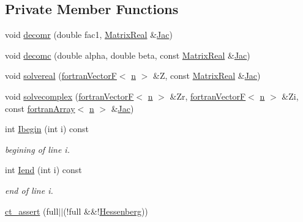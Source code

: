 \subsection*{Private Member Functions}
\begin{DoxyCompactItemize}
\item 
void \hyperlink{classodes_1_1Matrices_a8dc1bc6d92d06af08d4bf8fb2b357a7d}{decomr} (double fac1, \hyperlink{classodes_1_1Radau5cc_a8ef067b8852403d48d8528f601a4626a}{Matrix\+Real} \&\hyperlink{classodes_1_1Radau5cc_a67b952c35d2c7ecddc9dd75cb2c3afe1}{Jac})
\item 
void \hyperlink{classodes_1_1Matrices_a9f497885fb6dd9bb22179fab49d9b587}{decomc} (double alpha, double beta, const \hyperlink{classodes_1_1Radau5cc_a8ef067b8852403d48d8528f601a4626a}{Matrix\+Real} \&\hyperlink{classodes_1_1Radau5cc_a67b952c35d2c7ecddc9dd75cb2c3afe1}{Jac})
\item 
void \hyperlink{classodes_1_1Matrices_ace113b7bfa2377d513c2faaf645aecaa}{solvereal} (\hyperlink{classodes_1_1fortranVectorF}{fortran\+Vector\+F}$<$ \hyperlink{classodes_1_1Radau5cc_a3be3f05d2cdf7268e7d09b62ad9ad494}{n} $>$ \&Z, const \hyperlink{classodes_1_1Radau5cc_a8ef067b8852403d48d8528f601a4626a}{Matrix\+Real} \&\hyperlink{classodes_1_1Radau5cc_a67b952c35d2c7ecddc9dd75cb2c3afe1}{Jac})
\item 
void \hyperlink{classodes_1_1Matrices_abce8558c305de75740568ec55e49338e}{solvecomplex} (\hyperlink{classodes_1_1fortranVectorF}{fortran\+Vector\+F}$<$ \hyperlink{classodes_1_1Radau5cc_a3be3f05d2cdf7268e7d09b62ad9ad494}{n} $>$ \&Zr, \hyperlink{classodes_1_1fortranVectorF}{fortran\+Vector\+F}$<$ \hyperlink{classodes_1_1Radau5cc_a3be3f05d2cdf7268e7d09b62ad9ad494}{n} $>$ \&Zi, const \hyperlink{classodes_1_1fortranArray}{fortran\+Array}$<$ \hyperlink{classodes_1_1Radau5cc_a3be3f05d2cdf7268e7d09b62ad9ad494}{n} $>$ \&\hyperlink{classodes_1_1Radau5cc_a67b952c35d2c7ecddc9dd75cb2c3afe1}{Jac})
\item 
int \hyperlink{classodes_1_1Matrices_a9eb26d713d3e391f60d83798337d87a6}{Ibegin} (int i) const
\begin{DoxyCompactList}\small\item\em begining of line i. \end{DoxyCompactList}\item 
int \hyperlink{classodes_1_1Matrices_a589402cfa0e11666cd152a06e048c6f7}{Iend} (int i) const
\begin{DoxyCompactList}\small\item\em end of line i. \end{DoxyCompactList}\item 
\hyperlink{structcompat_afed990d40241e2a95d09e2ac8ac20cb4}{ct\+\_\+assert} (full$\vert$$\vert$(!full \&\&!\hyperlink{classodes_1_1Radau5cc_ae66683695f55d21d7c11ca7e3323d0e9}{Hessenberg}))
\end{DoxyCompactItemize}
